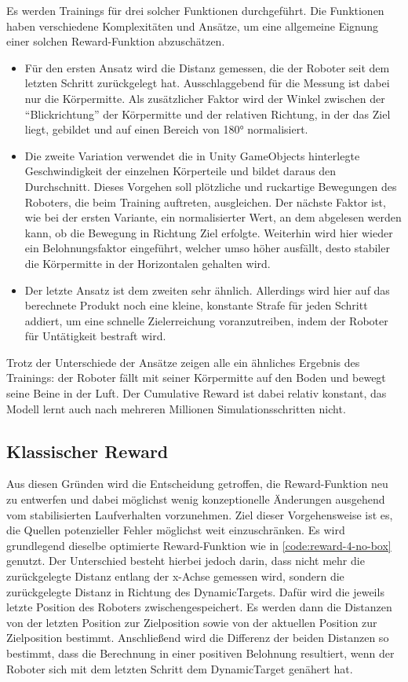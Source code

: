 Es werden Trainings für drei solcher Funktionen durchgeführt.
Die Funktionen haben verschiedene Komplexitäten und Ansätze, um eine allgemeine Eignung einer solchen Reward-Funktion abzuschätzen.
\begin{itemize}
    \item Für den ersten Ansatz wird die Distanz gemessen, die der Roboter seit dem letzten Schritt zurückgelegt hat.
    Ausschlaggebend für die Messung ist dabei nur die Körpermitte.
    Als zusätzlicher Faktor wird der Winkel zwischen der \enquote{Blickrichtung} der Körpermitte und der relativen Richtung, in der das Ziel liegt, gebildet und auf einen Bereich von 180° normalisiert.

    \item Die zweite Variation verwendet die in Unity GameObjects hinterlegte Geschwindigkeit der einzelnen Körperteile und bildet daraus den Durchschnitt.
    Dieses Vorgehen soll plötzliche und ruckartige Bewegungen des Roboters, die beim Training auftreten, ausgleichen.
    Der nächste Faktor ist, wie bei der ersten Variante, ein normalisierter Wert, an dem abgelesen werden kann, ob die Bewegung in Richtung Ziel erfolgte.
    Weiterhin wird hier wieder ein Belohnungsfaktor eingeführt, welcher umso höher ausfällt, desto stabiler die Körpermitte in der Horizontalen gehalten wird.

    \item Der letzte Ansatz ist dem zweiten sehr ähnlich.
    Allerdings wird hier auf das berechnete Produkt noch eine kleine, konstante Strafe für jeden Schritt addiert, um eine schnelle Zielerreichung voranzutreiben, indem der Roboter für Untätigkeit bestraft wird.
\end{itemize}

Trotz der Unterschiede der Ansätze zeigen alle ein ähnliches Ergebnis des Trainings: der Roboter fällt mit seiner Körpermitte auf den Boden und bewegt seine Beine in der Luft.
Der Cumulative Reward ist dabei relativ konstant, das Modell lernt auch nach mehreren Millionen Simulationsschritten nicht.

\subsection{Klassischer Reward}
\label{sec:classic-reward}
Aus diesen Gründen wird die Entscheidung getroffen, die Reward-Funktion neu zu entwerfen und dabei möglichst wenig konzeptionelle Änderungen ausgehend vom stabilisierten Laufverhalten vorzunehmen.
Ziel dieser Vorgehensweise ist es, die Quellen potenzieller Fehler möglichst weit einzuschränken.
Es wird grundlegend dieselbe optimierte Reward-Funktion wie in \autoref{code:reward-4-no-box} genutzt.
Der Unterschied besteht hierbei jedoch darin, dass nicht mehr die zurückgelegte Distanz entlang der x-Achse gemessen wird, sondern die zurückgelegte Distanz in Richtung des DynamicTargets.
Dafür wird die jeweils letzte Position des Roboters zwischengespeichert.
Es werden dann die Distanzen von der letzten Position zur Zielposition sowie von der aktuellen Position zur Zielposition bestimmt.
Anschließend wird die Differenz der beiden Distanzen so bestimmt, dass die Berechnung in einer positiven Belohnung resultiert, wenn der Roboter sich mit dem letzten Schritt dem DynamicTarget genähert hat.


